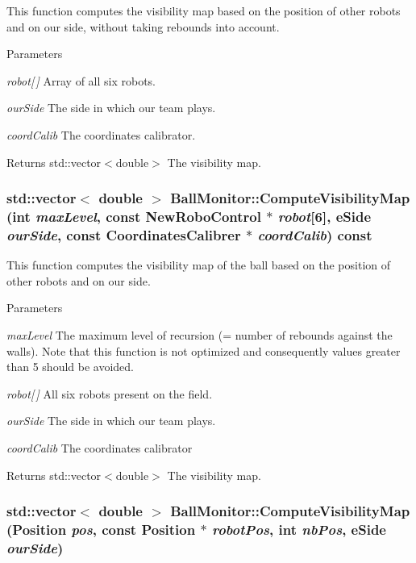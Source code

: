 This function computes the visibility map based on the position of other robots and on our side, without taking rebounds into account. 


\begin{DoxyParams}{Parameters}
\item[{\em robot\mbox{[}$\,$\mbox{]}}]Array of all six robots. \item[{\em ourSide}]The side in which our team plays. \item[{\em coordCalib}]The coordinates calibrator. \end{DoxyParams}
\begin{DoxyReturn}{Returns}
std::vector$<$double$>$ The visibility map. 
\end{DoxyReturn}
\hypertarget{classBallMonitor_aad046acf9df6b0381ab3b1b8351e97c5}{
\subsubsection[{ComputeVisibilityMap}]{\setlength{\rightskip}{0pt plus 5cm}std::vector$<$ double $>$ BallMonitor::ComputeVisibilityMap (int {\em maxLevel}, \/  const {\bf NewRoboControl} $\ast$ {\em robot}\mbox{[}6\mbox{]}, \/  eSide {\em ourSide}, \/  const {\bf CoordinatesCalibrer} $\ast$ {\em coordCalib}) const}}
\label{classBallMonitor_aad046acf9df6b0381ab3b1b8351e97c5}


This function computes the visibility map of the ball based on the position of other robots and on our side. 


\begin{DoxyParams}{Parameters}
\item[{\em maxLevel}]The maximum level of recursion (= number of rebounds against the walls). Note that this function is not optimized and consequently values greater than 5 should be avoided. \item[{\em robot\mbox{[}$\,$\mbox{]}}]All six robots present on the field. \item[{\em ourSide}]The side in which our team plays. \item[{\em coordCalib}]The coordinates calibrator \end{DoxyParams}
\begin{DoxyReturn}{Returns}
std::vector$<$double$>$ The visibility map. 
\end{DoxyReturn}
\hypertarget{classBallMonitor_a53e07299cf403dd036cab543d37fbf92}{
\subsubsection[{ComputeVisibilityMap}]{\setlength{\rightskip}{0pt plus 5cm}std::vector$<$ double $>$ BallMonitor::ComputeVisibilityMap (Position {\em pos}, \/  const Position $\ast$ {\em robotPos}, \/  int {\em nbPos}, \/  eSide {\em ourSide})}}
\label{classBallMonitor_a53e07299cf403dd036cab543d37fbf92}


